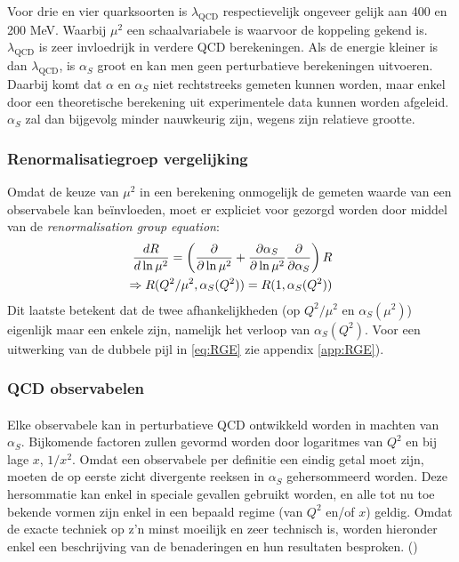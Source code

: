 \documentclass[a4paper,11pt]{article}
\numberwithin{equation}{section} %
\begin{document}
Voor drie en vier quarksoorten is $\lambda_\text{QCD}$ respectievelijk ongeveer gelijk aan 400 en 200 MeV.
Waarbij $\mu^2$ een schaalvariabele is waarvoor de koppeling gekend is.
$\lambda_\text{QCD}$ is zeer invloedrijk in verdere QCD berekeningen.
Als de energie kleiner is dan $\lambda_\text{QCD}$, is $\alpha_S$ groot en kan men geen perturbatieve berekeningen uitvoeren.
Daarbij komt dat $\alpha$ en $\alpha_S$ niet rechtstreeks gemeten kunnen worden, maar enkel door een theoretische berekening uit experimentele data kunnen worden afgeleid.
$\alpha_S$ zal dan bijgevolg minder nauwkeurig zijn, wegens zijn relatieve grootte.

    \subsubsection{Renormalisatiegroep vergelijking}
Omdat de keuze van $\mu^2$ in een berekening onmogelijk de gemeten waarde van een observabele kan beïnvloeden, moet er expliciet voor gezorgd worden door middel van de \textit{renormalisation group equation}:
\begin{align} \label{eq:RGE}
\frac{d R}{d\ln{\mu^2}} = \left(\frac{\partial}{\partial \ln{\mu^2}} + \frac{\partial \alpha_S}{\partial \ln{\mu^2}} \frac{\partial}{\partial \alpha_S} \right) R \notag \\
\Rightarrow R(Q^2/\mu^2, \alpha_S(Q^2)) = R(1,\alpha_S(Q^2))
\end{align}
Dit laatste betekent dat de twee afhankelijkheden (op $Q^2/\mu^2$ en $\alpha_S(\mu^2)$) eigenlijk maar een enkele zijn, namelijk het verloop van $\alpha_S(Q^2)$. Voor een uitwerking van de dubbele pijl in \eqref{eq:RGE} zie appendix \ref{app:RGE}).

    \subsubsection{QCD observabelen}
      \paragraph{}
Elke observabele kan in perturbatieve QCD ontwikkeld worden in machten van $\alpha_S$.
Bijkomende factoren zullen gevormd worden door logaritmes van $Q^2$ en bij lage $x$, $1/x^2$.
Omdat een observabele per definitie een eindig getal moet zijn, moeten de op eerste zicht divergente reeksen in $\alpha_S$ gehersommeerd worden.
Deze hersommatie kan enkel in speciale gevallen gebruikt worden, en alle tot nu toe bekende vormen zijn enkel in een bepaald regime (van $Q^2$ en/of $x$) geldig.
Omdat de exacte techniek op z’n minst moeilijk en zeer technisch is, worden hieronder enkel een beschrijving van de benaderingen en hun resultaten besproken. (\cite[sectie 9.5.2]{Barone})
\end{document}

